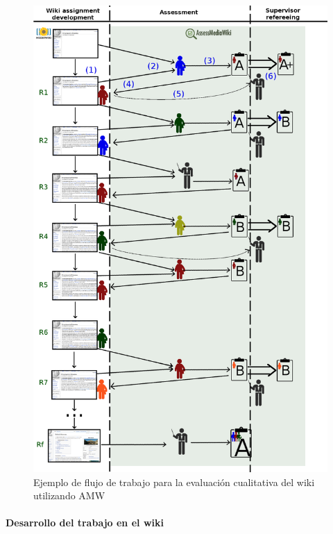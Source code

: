 \begin{figure}
  \begin{center}
    \includegraphics[scale=0.28]{AmwDiagram.png}
  \end{center}
  \caption{Ejemplo de flujo de trabajo para la evaluación cualitativa del wiki utilizando AMW}
  \label{fig:AmwDiagram}
\end{figure}

\paragraph*{Desarrollo del trabajo en el wiki}

